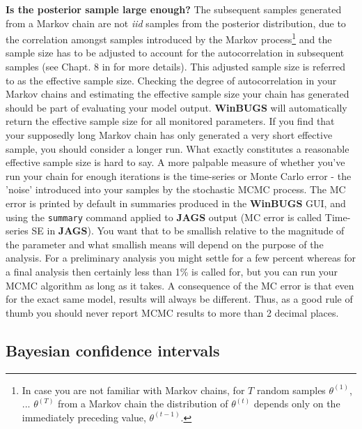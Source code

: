 {\bf Is the posterior sample large enough?}  The subsequent samples
generated from a Markov chain are not {\it iid} samples from the
posterior distribution, due to the correlation amongst samples
introduced by the Markov process\footnote{In case you are not familiar with Markov chains, for
  $T$ random samples $\theta^ {(1)}$, ... $\theta^{(T)}$ from a Markov chain
  the distribution of $\theta^{(t)}$ depends only on the immediately preceding
  value, $\theta^{(t-1)}$.} and the sample size has to be
adjusted to account for the autocorrelation in subsequent samples (see
Chapt. 8 in \citet{robert_casella:2010} for more details). This
adjusted sample size is referred to as the effective sample
size. Checking the degree of autocorrelation in your Markov chains and
estimating the effective sample size your chain has generated should
be part of evaluating your model output. {\bf WinBUGS} will
automatically return the effective sample size for all monitored
parameters. If you find that your supposedly long Markov chain has
only generated a very short effective sample, you should consider a
longer run. What exactly constitutes a reasonable effective sample
size is hard to say. A more palpable measure of whether you've run
your chain for enough iterations is the time-series or Monte Carlo
error - the 'noise' introduced into your samples by the stochastic
MCMC process. The MC error  is printed by
default in summaries produced in the {\bf WinBUGS} GUI, and using the
\mbox{\tt summary} command applied to {\bf JAGS} output (MC error is called
Time-series SE in {\bf JAGS}). You want that to be
smallish relative to the magnitude of the parameter and what smallish means will
depend on the purpose of the analysis. For a preliminary analysis you
might settle for a few percent whereas for a final analysis then
certainly less than 1\% is called for, but you can run your MCMC
algorithm as long as it takes. A consequence of the MC error is that
even for the exact same model, results will always be different. Thus,
as a good rule of thumb you should never report MCMC results to more
than 2 decimal places.

\subsection{Bayesian confidence intervals}

